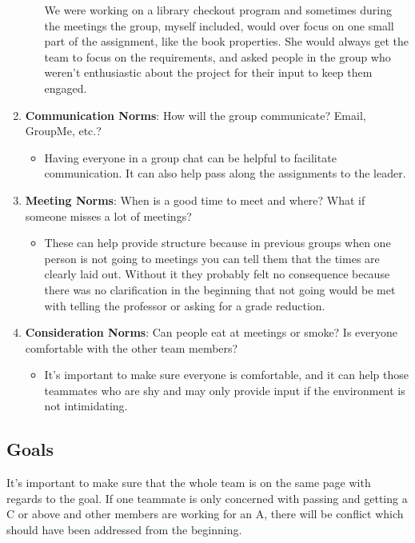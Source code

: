\documentclass[
10pt, %
a4paper, %
oneside, %
headinclude,footinclude, %
BCOR5mm, %
]{scrartcl}
\begin{document}
\begin{enumerate}
\begin{itemize}
  We were working on a library checkout program and sometimes during the
  meetings the group, myself included, would over focus on one small
  part of the assignment, like the book properties. She would always get
  the team to focus on the requirements, and asked people in the group
  who weren't enthusiastic about the project for their input to keep
  them engaged.
\end{itemize}
\item
  \textbf{Communication Norms}: How will the group communicate? Email,
  GroupMe, etc.?
\begin{itemize}
\item
  Having everyone in a group chat can be helpful to facilitate
  communication. It can also help pass along the assignments to the
  leader.
\end{itemize}
\item
  \textbf{Meeting Norms}: When is a good time to meet and where? What if
  someone misses a lot of meetings?
\begin{itemize}
\item
  These can help provide structure because in previous groups when one
  person is not going to meetings you can tell them that the times are
  clearly laid out. Without it they probably felt no consequence because
  there was no clarification in the beginning that not going would be
  met with telling the professor or asking for a grade reduction.
\end{itemize}
\item
  \textbf{Consideration Norms}: Can people eat at meetings or smoke? Is
  everyone comfortable with the other team members?
\begin{itemize}
\item
  It's important to make sure everyone is comfortable, and it can help
  those teammates who are shy and may only provide input if the
  environment is not intimidating.
\end{itemize}
\end{enumerate}

\subsection{Goals}

It's important to make sure that the whole team is on the same page with
regards to the goal. If one teammate is only concerned with passing and
getting a C or above and other members are working for an A, there will
be conflict which should have been addressed from the beginning.
\end{document}
